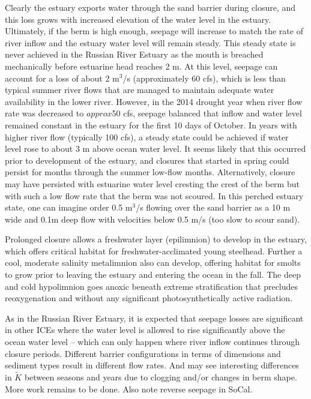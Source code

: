 \documentclass[preprint,12pt,authoryear]{elsarticle}
\begin{document}
Clearly the estuary exports water through the sand barrier during closure, and this loss grows with increased elevation of the water level in the estuary. Ultimately, if the berm is high enough, seepage will increase to match the rate of river inflow and the estuary water level will remain steady. This steady state is never achieved in the Russian River Estuary as the mouth is breached mechanically before estuarine head reaches 2 m.   At this level, seepage can account for a loss of about 2 m$^3$/s (approximately 60 cfs), which is less than typical summer river flows that are managed to maintain adequate water availability in the lower river. However, in the 2014 drought year when river flow rate was decreased to $approx$50 cfs, seepage balanced that inflow and water level remained constant in the estuary for the first 10 days of October. In years with higher river flow (typically 100 cfs), a steady state could be achieved if water level rose to about 3 m above ocean water level. It seems likely that this occurred prior to development of the estuary, and closures that started in spring could persist for months through the summer low-flow months. Alternatively, closure may have persisted with estuarine water level cresting the crest of the berm but with such a low flow rate that the berm was not scoured. In this perched estuary state, one can imagine order 0.5 m$^3$/s flowing over the sand barrier as a 10 m wide and 0.1m deep flow with velocities below 0.5 m/s (too slow to scour sand).  

Prolonged closure allows a freshwater layer (epilimnion) to develop in the estuary, which offers critical habitat for freshwater-acclimated young steelhead. Further a cool, moderate salinity metalimnion also can develop, offering habitat for smolts to grow prior to leaving the estuary and entering the ocean in the fall. The deep and cold hypolimnion goes anoxic beneath extreme stratification that precludes reoxygenation and without any significant photosynthetically active radiation.  

As in the Russian River Estuary, it is expected that seepage losses are significant in other ICEs where the water level is allowed to rise significantly above the ocean water level – which can only happen where river inflow continues through closure periods.  Different barrier configurations in terms of dimensions and sediment types result in different flow rates.  And may see interesting differences in $\tilde K$ between seasons and years due to clogging and/or changes in berm shape. More work remains to be done.  Also note reverse seepage in SoCal.
\end{document}

